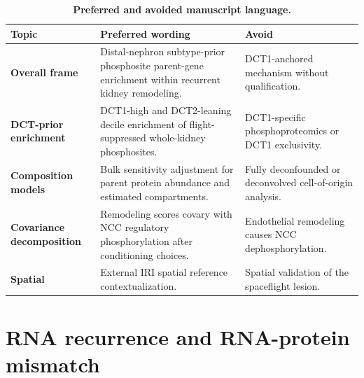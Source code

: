 \documentclass[10pt]{article}
\begin{document}
\begin{table}[H]
\centering\small
\caption{\textbf{Preferred and avoided manuscript language.}}
\label{tab:language}
\begin{tabularx}{\textwidth}{>{\bfseries}p{}XX}
\toprule
Topic & Preferred wording & Avoid \\
\midrule
Overall frame & Distal-nephron subtype-prior phosphosite parent-gene enrichment within recurrent kidney remodeling. & DCT1-anchored mechanism without qualification. \\
DCT-prior enrichment & DCT1-high and DCT2-leaning decile enrichment of flight-suppressed whole-kidney phosphosites. & DCT1-specific phosphoproteomics or DCT1 exclusivity. \\
Composition models & Bulk sensitivity adjustment for parent protein abundance and estimated compartments. & Fully deconfounded or deconvolved cell-of-origin analysis. \\
Covariance decomposition & Remodeling scores covary with NCC regulatory phosphorylation after conditioning choices. & Endothelial remodeling causes NCC dephosphorylation. \\
Spatial & External IRI spatial reference contextualization. & Spatial validation of the spaceflight lesion. \\
\bottomrule
\end{tabularx}
\end{table}

\section{RNA recurrence and RNA-protein mismatch}
\end{document}
